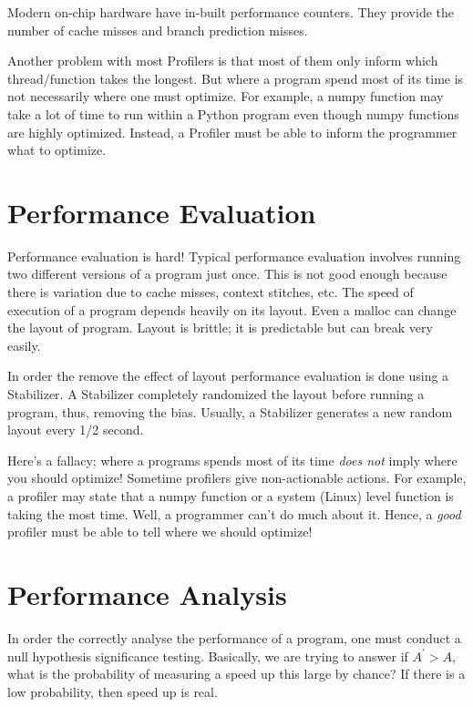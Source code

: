\documentclass[twoside]{article}
\begin{document}
Modern on-chip hardware have in-built performance counters. They provide the number of cache misses and branch prediction misses. 

Another problem with most Profilers is that most of them only inform which thread/function takes the longest. But where a program spend most of its time is not necessarily where one must optimize. For example, a numpy function may take a lot of time to run within a Python program even though numpy functions are highly optimized. Instead, a Profiler must be able to inform the programmer what to optimize. 

\section{Performance Evaluation}

Performance evaluation is hard! Typical performance evaluation involves running two different versions of a program just once. This is not good enough because there is variation due to cache misses, context stitches, etc. The speed of execution of a program depends heavily on its layout. Even a malloc can change the layout of program. Layout is brittle; it is predictable but can break very easily. 

In order the remove the effect of layout performance evaluation is done using a Stabilizer. A Stabilizer completely randomized the layout before running a program, thus, removing the bias. Usually, a Stabilizer generates a new random layout every 1/2 second. 

Here's a fallacy; where a programs spends most of its time \emph{does not} imply where you should optimize! Sometime profilers give non-actionable actions. For example, a profiler may state that a numpy function or a system (Linux) level function is taking the most time. Well, a programmer can't do much about it. Hence, a \emph{good} profiler must be able to tell where we should optimize!

\section{Performance Analysis}

In order the correctly analyse the performance of a program, one must conduct a null hypothesis significance testing. Basically, we are trying to answer if $A^{'} > A$, what is the probability of measuring a speed up this large by chance? If there is a low probability, then speed up is real. 

\end{document}

